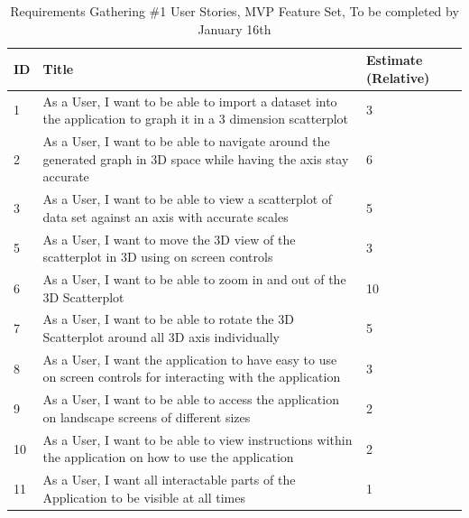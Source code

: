 \begin{table}[t]
    \begin{tabular}{ | l | l | l | }
        \hline
        ID & Title                                                                                                               & Estimate (Relative) \\
        \hline
        1  & As a User, I want to be able to import a dataset into the application to graph it in a 3 dimension scatterplot      & 3                   \\
        \hline
        2  & As a User, I want to be able to navigate around the generated graph in 3D space while having the axis stay accurate & 6                   \\
        \hline
        3  & As a User, I want to be able to view a scatterplot of data set against an axis with accurate scales                 & 5                   \\
        \hline
        5  & As a User, I want to move the 3D view of the scatterplot in 3D using on screen controls                             & 3                   \\
        \hline
        6  & As a User, I want to be able to zoom in and out of the 3D Scatterplot                                               & 10                  \\
        \hline
        7  & As a User, I want to be able to rotate the 3D Scatterplot around all 3D axis individually                           & 5                   \\
        \hline
        8  & As a User, I want the application to have easy to use on screen controls for interacting with the application       & 3                   \\
        \hline
        9  & As a User, I want to be able to access the application on landscape screens of different sizes                      & 2                   \\
        \hline
        10 & As a User, I want to be able to view instructions within the application on how to use the application              & 2                   \\
        \hline
        11 & As a User, I want all interactable parts of the Application to be visible at all times                              & 1                   \\
        \hline
    \end{tabular}
    \caption{Requirements Gathering \#1 User Stories, MVP Feature Set, To be completed by January 16th}
    \label{req1}
\end{table}

